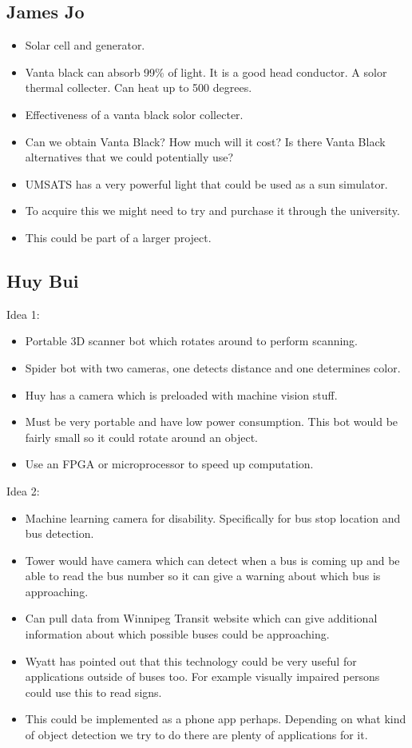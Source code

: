 \documentclass[a4paper]{article}
\begin{document}
	\subsection{James Jo}
	\begin{itemize}
		\item Solar cell and generator.
		\item Vanta black can absorb 99\% of light. It is a good head conductor. A solor thermal collecter. Can heat up to 500 degrees.
		\item Effectiveness of a vanta black solor collecter.
		\item Can we obtain Vanta Black? How much will it cost? Is there Vanta Black alternatives that we could potentially use?
		\item UMSATS has a very powerful light that could be used as a sun simulator.
		\item To acquire this we might need to try and purchase it through the university.
		\item This could be part of a larger project. 
	\end{itemize}

	\subsection{Huy Bui}
	Idea 1:
	\begin{itemize}
		\item Portable 3D scanner bot which rotates around to perform scanning.
		\item Spider bot with two cameras, one detects distance and one determines color.
		\item Huy has a camera which is preloaded with machine vision stuff.
		\item Must be very portable and have low power consumption. This bot would be fairly small so it could rotate around an object.
		\item Use an FPGA or microprocessor to speed up computation.
	\end{itemize}
	Idea 2:
	\begin{itemize}
		\item Machine learning camera for disability. Specifically for bus stop location and bus detection.
		\item Tower would have camera which can detect when a bus is coming up and be able to read the bus number so it can give a warning about which bus is approaching.
		\item Can pull data from Winnipeg Transit website which can give additional information about which possible buses could be approaching.
		\item Wyatt has pointed out that this technology could be very useful for applications outside of buses too. For example visually impaired persons could use this to read signs.
		\item This could be implemented as a phone app perhaps. Depending on what kind of object detection we try to do there are plenty of applications for it.
	\end{itemize}
\end{document}
